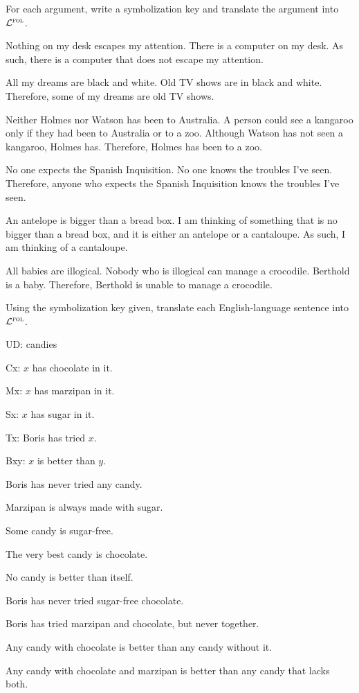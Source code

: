 \problempart
\label{pr.$\FOL$arguments}
For each argument, write a symbolization key and translate the argument into $\FOL$.
\begin{earg}
\item Nothing on my desk escapes my attention. There is a computer on my desk. As such, there is a computer that does not escape my attention.
\item All my dreams are black and white. Old TV shows are in black and white. Therefore, some of my dreams are old TV shows.
\item Neither Holmes nor Watson has been to Australia. A person could see a kangaroo only if they had been to Australia or to a zoo. Although Watson has not seen a kangaroo, Holmes has. Therefore, Holmes has been to a zoo.
\item No one expects the Spanish Inquisition. No one knows the troubles I've seen. Therefore, anyone who expects the Spanish Inquisition knows the troubles I've seen.
\item An antelope is bigger than a bread box. I am thinking of something that is no bigger than a bread box, and it is either an antelope or a cantaloupe. As such, I am thinking of a cantaloupe.
\item All babies are illogical. Nobody who is illogical can manage a crocodile. Berthold is a baby. Therefore, Berthold is unable to manage a crocodile.
\end{earg}

\solutions
\problempart
\label{pr.$\FOL$candies}
Using the symbolization key given, translate each English-language sentence into $\FOL$.
\begin{ekey}
\item[UD:] candies
\item[Cx:] $x$ has chocolate in it.
\item[Mx:] $x$ has marzipan in it.
\item[Sx:] $x$ has sugar in it.
\item[Tx:] Boris has tried $x$.
\item[Bxy:] $x$ is better than $y$.
\end{ekey}
\begin{earg}
\item Boris has never tried any candy.
\item Marzipan is always made with sugar.
\item Some candy is sugar-free.
\item The very best candy is chocolate.
\item No candy is better than itself.
\item Boris has never tried sugar-free chocolate.
\item Boris has tried marzipan and chocolate, but never together.
\item Any candy with chocolate is better than any candy without it.
\item Any candy with chocolate and marzipan is better than any candy that lacks both.
\end{earg}



